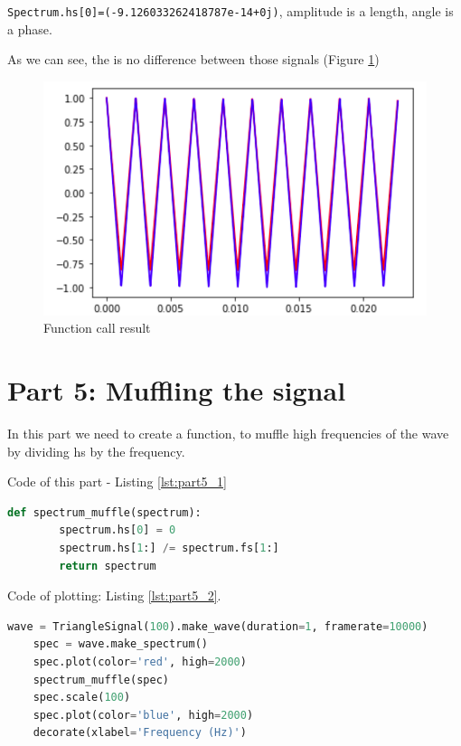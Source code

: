 \documentclass[a4paper]{article}
\begin{document}
            \texttt{Spectrum.hs[0]=(-9.126033262418787e-14+0j)}, amplitude is a length, angle is a phase.
            
            As we can see, the is no difference between those signals (Figure \ref{fig:part4})
            
            \begin{figure}[H]
                \centering
                \includegraphics[width=\textwidth]{img/triag_no_diff.png}
                \caption{Function call result}
                \label{fig:part4}
            \end{figure}
            
    \newpage
        \section{Part 5: Muffling the signal}
        
            In this part we need to create a function, to muffle high frequencies of the wave by dividing hs by the frequency.
            
            Code of this part - Listing \ref{lst:part5_1}
            
            \begin{lstlisting}[language=Python,caption=Definition of the function,label={lst:part5_1}]
    def spectrum_muffle(spectrum):
        spectrum.hs[0] = 0
        spectrum.hs[1:] /= spectrum.fs[1:]
        return spectrum
            \end{lstlisting}
            
            Code of plotting: Listing \ref{lst:part5_2}.
            
            \begin{lstlisting}[language=Python,caption=Function usage,label={lst:part5_2}]
    wave = TriangleSignal(100).make_wave(duration=1, framerate=10000)
    spec = wave.make_spectrum()
    spec.plot(color='red', high=2000)
    spectrum_muffle(spec)
    spec.scale(100)
    spec.plot(color='blue', high=2000)
    decorate(xlabel='Frequency (Hz)')
            \end{lstlisting}
            
\end{document}
